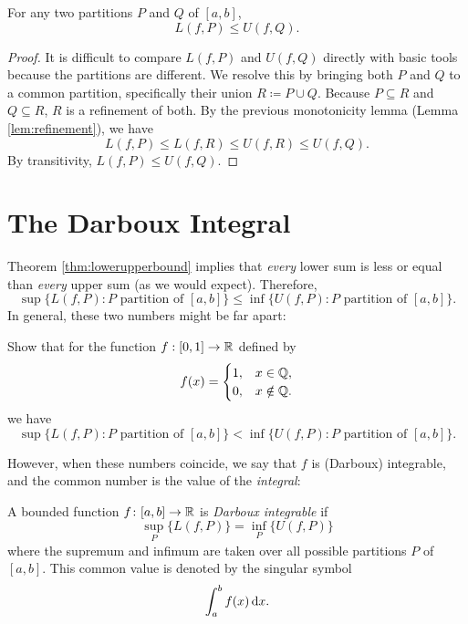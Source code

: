 \documentclass[../analysis1.tex]{subfiles}
\begin{document}
\begin{theorem}
\label{thm:lowerupperbound}
    \begin{shaded*}
        For any two partitions $P$ and $Q$ of $[a,b]$, 
        \[
            L(f,P) \le U(f,Q).
        \]
    \end{shaded*}
\end{theorem}

\begin{proof}
    It is difficult to compare $L(f,P)$ and $U(f,Q)$ directly with basic tools because the partitions are different. We resolve this by bringing both $P$ and $Q$ to a common partition, specifically their union $R \coloneqq P \cup Q$. Because $P \subseteq R$ and $Q \subseteq R$, $R$ is a refinement of both. By the previous monotonicity lemma (Lemma \ref{lem:refinement}), we have
    \[
        L(f,P) \le L(f,R) \le U(f,R) \le U(f,Q).
    \]
    By transitivity, $L(f,P) \le U(f,Q)$.
\end{proof}

\section{The Darboux Integral}

Theorem \ref{thm:lowerupperbound} implies that \textit{every} lower sum is less or equal than \textit{every} upper sum (as we would expect). Therefore,
\[\sup \{L(f,P):P\text{ partition of }[a,b]\}\le \inf \{U(f,P):P\text{ partition of }[a,b]\}.\]
In general, these two numbers might be far apart:
\begin{exercise*}
    Show that for the function $f:[0,1]\to\mathbb{R}$ defined by \[f(x)=\begin{cases}
        1, & x\in\mathbb{Q}, \\
        0, & x\notin \mathbb{Q}.
    \end{cases}\]
    we have \[\sup \{L(f,P):P\text{ partition of }[a,b]\} < \inf \{U(f,P):P\text{ partition of }[a,b]\}.\]

\end{exercise*}

However, when these numbers coincide, we say that $f$ is (Darboux) integrable, and the common number is the value of the \textit{integral}:


\begin{definition}
    \begin{shaded*}
        A bounded function $f \colon [a,b] \to \mathbb{R}$ is \textit{Darboux integrable} if 
        \[
            \sup_{P} \{ L(f,P) \} = \inf_{P} \{ U(f,P) \}
        \]
        where the supremum and infimum are taken over all possible partitions $P$ of $[a,b]$. This common value is denoted by the singular symbol 
        \[
            \int_a^b f(x) \d{x}.
        \]
    \end{shaded*}
\end{definition}
\end{document}
